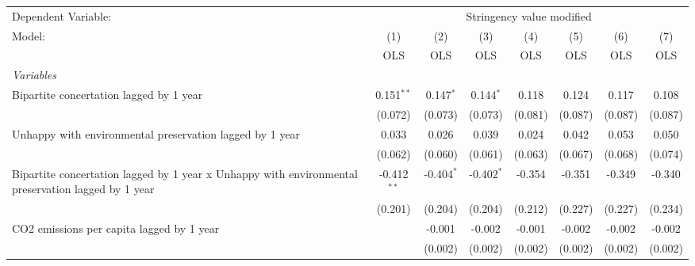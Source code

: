 
\begingroup
\centering
\begin{tabular}{lccccccc}
   \toprule
   Dependent Variable: & \multicolumn{7}{c}{Stringency value modified}\\
   Model:                                                                                             & (1)           & (2)          & (3)          & (4)     & (5)     & (6)     & (7)\\  
                                                                                                      &  OLS          & OLS          & OLS          & OLS     & OLS     & OLS     & OLS\\  
   \midrule
   \emph{Variables}\\
   Bipartite concertation lagged by 1 year                                                            & 0.151$^{**}$  & 0.147$^{*}$  & 0.144$^{*}$  & 0.118   & 0.124   & 0.117   & 0.108\\   
                                                                                                      & (0.072)       & (0.073)      & (0.073)      & (0.081) & (0.087) & (0.087) & (0.087)\\   
   Unhappy with environmental preservation lagged by 1 year                                           & 0.033         & 0.026        & 0.039        & 0.024   & 0.042   & 0.053   & 0.050\\   
                                                                                                      & (0.062)       & (0.060)      & (0.061)      & (0.063) & (0.067) & (0.068) & (0.074)\\   
   Bipartite concertation lagged by 1 year x Unhappy with environmental preservation lagged by 1 year & -0.412$^{**}$ & -0.404$^{*}$ & -0.402$^{*}$ & -0.354  & -0.351  & -0.349  & -0.340\\   
                                                                                                      & (0.201)       & (0.204)      & (0.204)      & (0.212) & (0.227) & (0.227) & (0.234)\\   
   CO2 emissions per capita lagged by 1 year                                                          &               & -0.001       & -0.002       & -0.001  & -0.002  & -0.002  & -0.002\\   
                                                                                                      &               & (0.002)      & (0.002)      & (0.002) & (0.002) & (0.002) & (0.002)\\   

\end{tabular}
